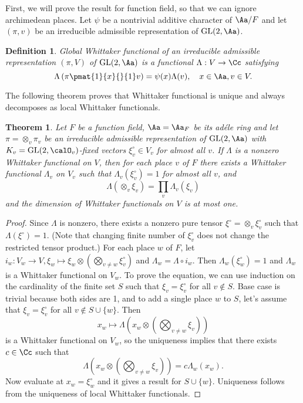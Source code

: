 \documentclass{article}
\newtheorem{theorem}{Theorem}[section]
\newtheorem{definition}{Definition}[section]
\newcommand{\GL}{\mathrm{GL}}
\begin{document}
First, we will prove the result for function field, so that we can ignore archimedean places. 
Let $\psi$ be a nontrivial additive character of $\Aa/F$ and let $(\pi, v)$ be an irreducible admissible representation of $\GL(2, \Aa)$. 
\begin{definition}
Global Whittaker functional of an irreducible admissible representation $(\pi, V)$ of $\GL(2, \Aa)$ is a functional $\Lambda : V\to \Cc$ satisfying 
$$
\Lambda \left( \pi \pmat{1}{x}{}{1}v \right) = \psi(x) \Lambda(v), \quad x\in \Aa, v\in V.
$$
\end{definition}
The following theorem proves that Whittaker functional is unique and always decomposes as local Whittaker functionals. 
\begin{theorem}
\label{ffwituniq}
Let $F$ be a function field, $\Aa = \Aa_{F}$ be its ad\'ele ring and let $\pi = \otimes_{v} \pi_{v}$ be an irreducible admissible representation of $\GL(2, \Aa)$ with $K_{v} = \GL(2, \calO_{v})$-fixed vectors $\xi_{v}^{\circ}\in V_{v}$ for almost all $v$. 
If $\Lambda$ is a nonzero Whittaker functional on $V$, then for each place $v$ of $F$ there exists a Whittaker functional $\Lambda_{v}$ on $V_{v}$ such that $\Lambda_{v}(\xi_{v}^{\circ}) = 1$ for almost all $v$, and 
$$
\Lambda ( \otimes_{v}\xi_{v}) = \prod_{v} \Lambda_{v}(\xi_{v})
$$
and the dimension of Whittaker functionals on $V$ is at most one. 
\end{theorem}
\begin{proof}
Since $\Lambda$ is nonzero, there exists a nonzero pure tensor $\xi^{\circ} = \otimes_{v} \xi_{v}^{\circ}$ such that $\Lambda(\xi^{\circ})= 1$. (Note that changing finite number of $\xi_{v}^{\circ}$ does not change the restricted tensor product.) 
For each place $w$ of $F$, let $i_{w} : V_{w} \to V, \xi_{w} \mapsto \xi_{w} \otimes (\bigotimes_{v\neq w} \xi_{v}^{\circ})$ and $\Lambda_{w} = \Lambda \circ i_{w}$. 
Then $\Lambda_{w}(\xi_{w}^{\circ}) =1$ and $\Lambda_{w}$ is a Whittaker functional on $V_{w}$. 
To prove the equation, we can use induction on the cardinality of the finite set $S$ such that $\xi_{v} =\xi_{v}^{\circ}$ for all $v\not\in S$. 
Base case is trivial because both sides are 1, and to add a single place $w$ to $S$, let's assume that $\xi_{v} = \xi_{v}^{\circ}$ for all $v\not\in S\cup \{w\}$. 
Then 
$$
x_{w} \mapsto \Lambda \left( x_{w} \otimes \left( \bigotimes_{v\neq w} \xi_{v}\right)\right)
$$
is a Whittaker functional on $V_{w}$, so the uniqueness implies that there exists $c\in \Cc$ such that 
$$
\Lambda \left( x_{w} \otimes \left( \bigotimes_{v\neq w} \xi_{v}\right)\right) = c\Lambda_{w} (x_{w}).
$$
Now evaluate at $x_{w} = \xi_{w}^{\circ}$ and it gives a result for $S \cup \{w\}$. 
Uniqueness follows from the uniqueness of local Whittaker functionals. 
\end{proof}
\end{document}
